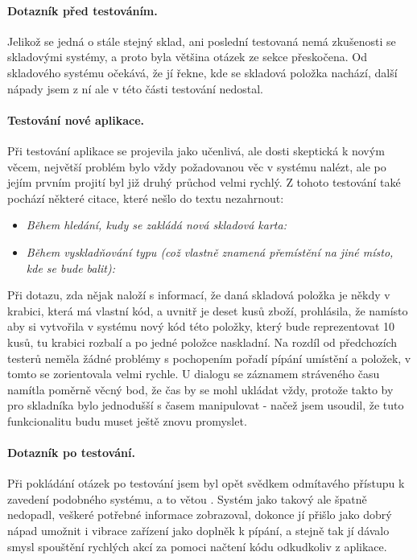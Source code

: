 \paragraph{Dotazník před testováním.} Jelikož se jedná o stále stejný sklad, ani poslední testovaná nemá zkušenosti se skladovými systémy, a proto byla většina otázek ze sekce  přeskočena. Od skladového systému očekává, že jí řekne, kde se skladová položka nachází, další nápady jsem z ní ale v této části testování nedostal.

\paragraph{Testování nové aplikace.} Při testování aplikace se projevila jako učenlivá, ale dosti skeptická k novým věcem, největší problém bylo vždy požadovanou věc v systému nalézt, ale po jejím prvním projití byl již druhý průchod velmi rychlý. Z tohoto testování také pochází některé citace, které nešlo do textu nezahrnout:
\begin{itemize}
	\item \emph{Během hledání, kudy se zakládá nová skladová karta:} 
	\item \emph{Během vyskladňování typu  (což vlastně znamená přemístění na jiné místo, kde se bude balit):} 
\end{itemize}
Při dotazu, zda nějak naloží s informací, že daná skladová položka je někdy v krabici, která má vlastní kód, a uvnitř je deset kusů zboží, prohlásila, že namísto aby si vytvořila v systému nový kód této položky, který bude reprezentovat 10 kusů, tu krabici rozbalí a po jedné položce naskladní. Na rozdíl od předchozích testerů neměla žádné problémy s pochopením pořadí pípání umístění a položek, v tomto se zorientovala velmi rychle. U dialogu se záznamem stráveného času namítla poměrně věcný bod, že čas by se mohl ukládat vždy, protože takto by pro skladníka bylo jednodušší s časem manipulovat - načež jsem usoudil, že tuto funkcionalitu budu muset ještě znovu promyslet.

\paragraph{Dotazník po testování.} Při pokládání otázek po testování jsem byl opět svědkem odmítavého přístupu k zavedení podobného systému, a to větou . Systém jako takový ale špatně nedopadl, veškeré potřebné informace zobrazoval, dokonce jí přišlo jako dobrý nápad umožnit i vibrace zařízení jako doplněk k pípání, a stejně tak jí dávalo smysl spouštění rychlých akcí za pomoci načtení kódu odkudkoliv z aplikace.

